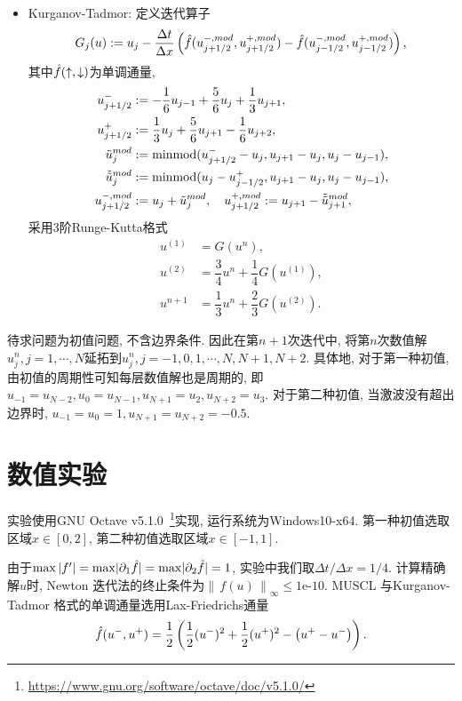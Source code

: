 \documentclass[a4paper, 12pt]{amsart}
\newcommand{\lr}[1]{\left(#1\right)}
\newcommand{\abs}[1]{\left\lvert#1\right\rvert}
\newcommand{\nm}[2]{\left\|\,#1\,\right\|_{#2}}
\newcommand{\minmod}{\mathrm{minmod}}
\numberwithin{equation}{section}
\begin{document}
\begin{itemize}
\begin{align*}
\end{align*}
\item Kurganov-Tadmor:
定义迭代算子
\[G_j(u):=u_j-\dfrac{\Delta t}{\Delta x}\lr{\Hat{f}(u_{j+1/2}^{-,mod},u_{j+1/2}^{+,mod})-\Hat{f}(u_{j-1/2}^{-,mod},u_{j-1/2}^{+,mod})},\]
其中$\Hat{f}(\uparrow,\downarrow)$为单调通量, 
\begin{align*}
u_{j+1/2}^{-}&:=-\dfrac16u_{j-1}+\dfrac56u_j+\dfrac13u_{j+1},\\
u_{j+1/2}^{+}&:=\dfrac13u_j+\dfrac56u_{j+1}-\dfrac16u_{j+2},\\
\Tilde{u}_j^{mod}&:=\minmod(u_{j+1/2}^{-}-u_j,u_{j+1}-u_j,u_j-u_{j-1}),\\
\Tilde{\Tilde{u}}_j^{mod}&:=\minmod(u_j-u_{j-1/2}^{+},u_{j+1}-u_j,u_j-u_{j-1}),\\
u_{j+1/2}^{-,mod}&:=u_j+\Tilde{u}_j^{mod},\quad u_{j+1/2}^{+,mod}:=u_{j+1}-\Tilde{\Tilde{u}}_{j+1}^{mod},
\end{align*}
采用3阶Runge-Kutta格式
\begin{align*}
u^{(1)}&=G(u^n),\\
u^{(2)}&=\dfrac34u^n+\dfrac14G(u^{(1)}),\\
u^{n+1}&=\dfrac13u^n+\dfrac23G(u^{(2)}).
\end{align*}
\end{itemize}

待求问题为初值问题, 不含边界条件. 因此在第$n+1$次迭代中, 将第$n$次数值解$u_j^n,j=1,\cdots,N$延拓到$u_j^n,j=-1,0,1,\cdots,N,N+1,N+2$. 具体地, 对于第一种初值, 由初值的周期性可知每层数值解也是周期的, 即$u_{-1}=u_{N-2},u_0=u_{N-1},u_{N+1}=u_2,u_{N+2}=u_3$. 对于第二种初值, 当激波没有超出边界时, $u_{-1}=u_0=1,u_{N+1}=u_{N+2}=-0.5$.

\section{\large\bf 数值实验}
实验使用GNU Octave v5.1.0~\footnote{\url{https://www.gnu.org/software/octave/doc/v5.1.0/}}实现, 运行系统为Windows10-x64. 第一种初值选取区域$x\in[0,2]$, 第二种初值选取区域$x\in[-1,1]$.

由于$\max\abs{f'}=\max\lvert\partial_1\Hat{f}\rvert=\max\lvert\partial_2\Hat{f}\rvert=1$, 实验中我们取$\Delta t/\Delta x=1/4$. 计算精确解$u$时, Newton 迭代法的终止条件为$\nm{f(u)}{\infty}\le\text{1e-10}$. MUSCL 与Kurganov-Tadmor 格式的单调通量选用Lax-Friedrichs通量
\[\Hat{f}(u^{-},u^{+})=\dfrac12\lr{\dfrac12(u^{-})^2+\dfrac12(u^{+})^2-\lr{u^{+}-u^{-}}}.\]
\end{document}
